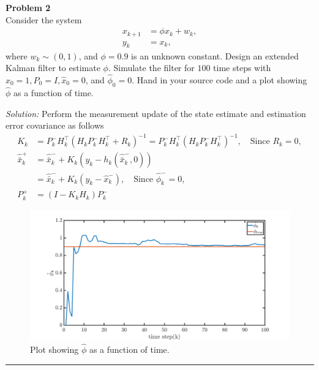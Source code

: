 \documentclass[a4paper, 11pt]{extarticle}
\newenvironment{problem}[2][Problem]
    { \begin{mdframed}[backgroundcolor=gray!20] \textbf{#1 #2} \\}
    {  \end{mdframed}}
\newenvironment{solution}
    {\textit{Solution:}}
    {}
\begin{document}
\begin{problem}{2}
Consider the system
\begin{align*}
    x_{k+1} &= \phi x_{k} + w_{k}, \\
    y_k &= x_k, 
\end{align*}
where $w_k \sim (0, 1)$, and $\phi = 0.9$ is an unknown constant. Design an extended Kalman filter to estimate $\phi$. Simulate the filter for $100$ time steps with $x_0 = 1, P_0 = I , \hat{x}_{0} = 0$, and $\hat{\phi}_{0} = 0$. Hand in your source code and a plot showing $\hat{\phi}$ as a function of time.
\end{problem}
\begin{solution}
Perform the measurement update of the state estimate and estimation error covariance as follows
\begin{align*}
    K_k &= P^{-}_k H^{\top}_k (H_k P^{-}_k H^{\top}_k + R_k)^{-1} = P^{-}_k H^{\top}_k (H_k P^{-}_k H^{\top}_k)^{-1}, \quad \text{Since }R_k = 0, \\
    \hat{\bar{x}}^{+}_{k} &= \hat{\bar{x}}^{-}_{k} + K_k (y_k - h_k(\hat{\bar{x}}^{-}_{k}, 0)) \\
    &= \hat{\bar{x}}^{-}_{k} + K_k (y_k - \hat{x}^{-}_{k}), \quad \text{Since } \hat{\phi}^{-}_{k} = 0, \\
    P^{+}_k &= (I - K_k H_k) P^{-}_k
\end{align*}
\begin{figure}[H]
    \centering
    \includegraphics[scale=0.25]{q2.png}
    \caption{Plot showing $\hat{\phi}$ as a function of time.}
    \label{fig_q2l}
\end{figure}
\end{solution} 

\noindent\rule{7in}{2.8pt}
\end{document}
